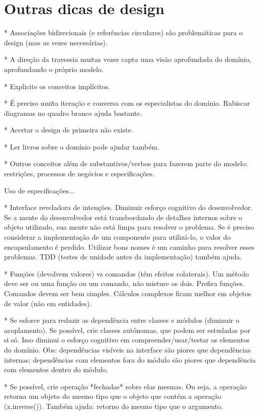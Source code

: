 \documentclass[a4paper, 12pt]{article}
\begin{document}
\section{Outras dicas de design}

* Associações bidirecionais (e referências circulares) são problemáticas para o design (mas as vezes necessárias).

* A direção da travessia muitas vezes capta uma visão aprofundada do domínio, aprofundando o próprio modelo. 

* Explicite os conceitos implícitos.

* É preciso muita iteração e conversa com os especialistas do domínio. Rabiscar diagramas no quadro branco ajuda bastante. 

* Acertar o design de primeira não existe.

* Ler livros sobre o domínio pode ajudar também.

* Outros conceitos além de substantivos/verbos para fazerem parte do modelo: restrições, processos de negócios e especificações.

Uso de especificações...

* Interface reveladora de intenções. Diminuir esforço cognitivo do desenvolvedor. Se a mente do desenvolvedor está transbordando de detalhes internos sobre o objeto utilizado, sua mente não está limpa para resolver o problema. Se é preciso considerar a implementação de um componente para utilizá-lo, o valor do encapsulamento é perdido. Utilizar bons nomes é um caminho para resolver esses problemas. TDD (testes de unidade antes da implementação) também ajuda.

* Funções (devolvem valores) vs comandos (têm efeitos colaterais). Um método deve ser ou uma função ou um comando, não misture os dois. Prefira funções. Comandos devem ser bem simples. Cálculos complexos ficam melhor em objetos de valor (não em entidades).

* Se esforce para reduzir as dependência entre classes e módulos (diminuir o acoplamento). Se possível, crie classes autônomas, que podem ser estudadas por si só. Isso diminui o esforço cognitivo em compreender/usar/testar os elementos do domínio. Obs: dependências visíveis na interface são piores que dependências internas; dependências com elementos fora do módulo são piores que dependência com elementos dentro do módulo.

* Se possível, crie operação *fechadas* sobre elas mesmas. Ou seja, a operação retorna um objeto do mesmo tipo que o objeto que contém a operação (x.inverse()). Também ajuda: retorno do mesmo tipo que o argumento.
\end{document}
